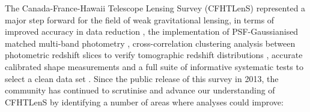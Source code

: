 
The Canada-France-Hawaii Telescope Lensing Survey (CFHTLenS) represented a
major step forward for the field of weak gravitational lensing, in terms of
improved accuracy in data reduction \citep{CFHTLenS-data}, the implementation
of PSF-Gaussianised matched multi-band photometry
\citep{CFHTLenS-photoz}, cross-correlation clustering analysis between
photometric redshift slices to verify tomographic redshift distributions
\citep{CFHTLenS-2pt-tomo}, accurate calibrated shape measurements
\citep{CFHTLenS-shapes} and a full suite of informative systematic tests to
select a clean data set \citep{CFHTLenS-sys}. Since the public release
of this survey in 2013, the community has continued to scrutinise and advance
our understanding of CFHTLenS by identifying a number of areas where analyses
could improve:
%
